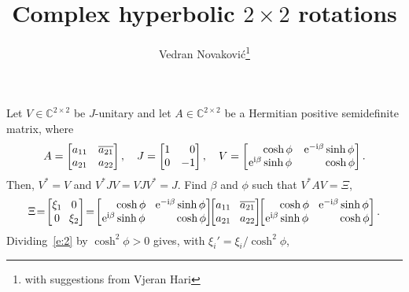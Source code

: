 \documentclass[a4paper,12pt,twoside]{article}
\title{Complex hyperbolic $2\times 2$ rotations}
\author{Vedran Novakovi\'{c}\footnote{with suggestions from Vjeran Hari}}
\begin{document}
\maketitle
Let $V\in\mathbb{C}^{2\times 2}$ be $J$-unitary and let
$A\in\mathbb{C}^{2\times 2}$ be a Hermitian positive semidefinite
matrix, where
\begin{equation}
  A=\begin{bmatrix}
  a_{11} & \overline{a_{21}}\\
  a_{21} & a_{22}
  \end{bmatrix},\quad
  J=\begin{bmatrix}
  1 & \hphantom{-}0\\
  0 & -1
  \end{bmatrix},\quad
  V=\begin{bmatrix}
  \hphantom{\mathrm{e}^{\mathrm{i}\beta}}\cosh\phi & \mathrm{e}^{-\mathrm{i}\beta}\sinh\phi\\
  \mathrm{e}^{\mathrm{i}\beta}\sinh\phi & \hphantom{\mathrm{e}^{-\mathrm{i}\beta}}\cosh\phi
  \end{bmatrix}.
  \label{e:1}
\end{equation}
Then, $V^{\ast}=V$ and $V^{\ast}JV=VJV^{\ast}=J$.  Find $\beta$ and
$\phi$ such that $V^{\ast}AV=\Xi$,
\begin{equation}
  \Xi\!=\!\begin{bmatrix}
  \xi_1 & \!\!0\\
  0 & \!\!\xi_2
  \end{bmatrix}\!=\!\begin{bmatrix}
  \hphantom{\mathrm{e}^{\mathrm{i}\beta}}\cosh\phi & \!\mathrm{e}^{-\mathrm{i}\beta}\sinh\phi\\
  \mathrm{e}^{\mathrm{i}\beta}\sinh\phi & \!\hphantom{\mathrm{e}^{-\mathrm{i}\beta}}\cosh\phi
  \end{bmatrix}\!\!\begin{bmatrix}
  a_{11} & \!\overline{a_{21}}\\
  a_{21} & \!a_{22}
  \end{bmatrix}\!\!\begin{bmatrix}
  \hphantom{\mathrm{e}^{\mathrm{i}\beta}}\cosh\phi & \!\mathrm{e}^{-\mathrm{i}\beta}\sinh\phi\\
  \mathrm{e}^{\mathrm{i}\beta}\sinh\phi & \!\hphantom{\mathrm{e}^{-\mathrm{i}\beta}}\cosh\phi
  \end{bmatrix}.
  \label{e:2}
\end{equation}
Dividing~\eqref{e:2} by $\cosh^2\phi>0$ gives, with
$\xi_i'=\xi_i^{}/\cosh^2\phi$,
\end{document}
